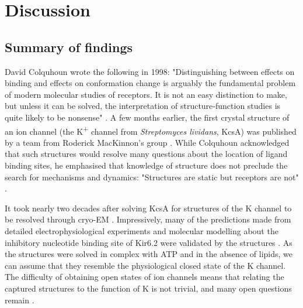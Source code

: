 \chapter{\label{ch:7}Discussion} 

\graphicspath{{figures/ch7/}}

\minitoc

\section{Summary of findings}

David Colquhoun wrote the following in 1998:
"Distinguishing between effects on binding and effects on conformation change is arguably the fundamental problem of modern molecular studies of receptors.
It is not an easy distinction to make, but unless it can be solved, the interpretation of structure‐function studies is quite likely to be nonsense" \cite{colquhoun_binding_1998}.
A few months earlier, the first crystal structure of an ion channel (the K\textsuperscript{+} channel from \textit{Streptomyces lividans}, KcsA) was published by a team from Roderick MacKinnon's group \cite{doyle_structure_1998}.
While Colquhoun acknowledged that such structures would resolve many questions about the location of ligand binding sites, he emphasised that knowledge of structure does not preclude the search for mechanisms and dynamics: "Structures are static but receptors are not" \cite{colquhoun_binding_1998}.

It took nearly two decades after solving KcsA for structures of the K\ATP{} channel to be resolved through cryo-EM \cite{lee_molecular_2017, martin_anti-diabetic_2017-1, li_structure_2017-1, martin_mechanism_2019-1}.
Impressively, many of the predictions made from detailed electrophysiological experiments and molecular modelling about the inhibitory nucleotide binding site of Kir6.2 were validated by the structures \cite{tucker_molecular_1998, drain_katp_1998, li_i182_2000, cukras_structural_2002, cukras_role_2002, trapp_identification_2003, li_ligand-dependent_2005, antcliff_functional_2005, haider_identification_2007}.
As the structures were solved in complex with ATP and in the absence of lipids, we can assume that they resemble the physiological closed state of the K\ATP{} channel.
The difficulty of obtaining open states of ion channels means that relating the captured structures to the function of K\ATP{} is not trivial, and many open questions remain \cite{puljung_cryo-electron_2018}.

